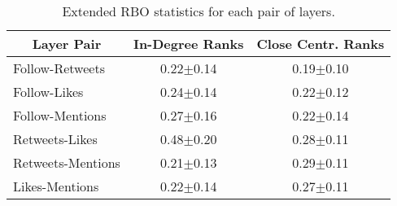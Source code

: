 \begin{table}[htb]
\caption{Extended RBO statistics for each pair of layers.}
\label{tab:rbo_statistics}
\centering
\scriptsize
\setlength\tabcolsep{6pt} %
\begin{tabular}{|l|c|c|}
\hline 
\multicolumn{1}{|c|}{\textbf{Layer Pair}} & \multicolumn{1}{|c|}{\textbf{In-Degree Ranks}} & \multicolumn{1}{|c|}{\textbf{Close Centr. Ranks}} \\ \hline
\hline \hline
{Follow-Retweets}   &       0.22$\pm$0.14       &       0.19$\pm$0.10           \\ \hline
{Follow-Likes}      &       0.24$\pm$0.14       &       0.22$\pm$0.12           \\ \hline
{Follow-Mentions}   &       0.27$\pm$0.16       &       0.22$\pm$0.14           \\ \hline
{Retweets-Likes}    &       0.48$\pm$0.20       &       0.28$\pm$0.11           \\ \hline
{Retweets-Mentions} &       0.21$\pm$0.13       &       0.29$\pm$0.11           \\ \hline
{Likes-Mentions}    &       0.22$\pm$0.14       &       0.27$\pm$0.11           \\ \hline
\hline
\end{tabular}
\end{table}